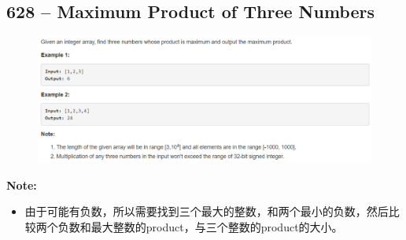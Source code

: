 \documentclass[a4paper,12pt]{article}
\begin{document}
\subsection{628 -- Maximum Product of Three Numbers}
\begin{figure}[H]
	\begin{center}
		\includegraphics[width=18cm]{628.png}
	\end{center}
\end{figure}
\textbf{\large{Note:}}
\par
\vspace{0.5em}
\begin{CJK*}{UTF8}{gbsn}
	\begin{itemize}
		\item 由于可能有负数，所以需要找到三个最大的整数，和两个最小的负数，然后比较两个负数和最大整数的product，与三个整数的product的大小。
	\end{itemize}
	\clearpage
\end{CJK*}	
\end{document}
